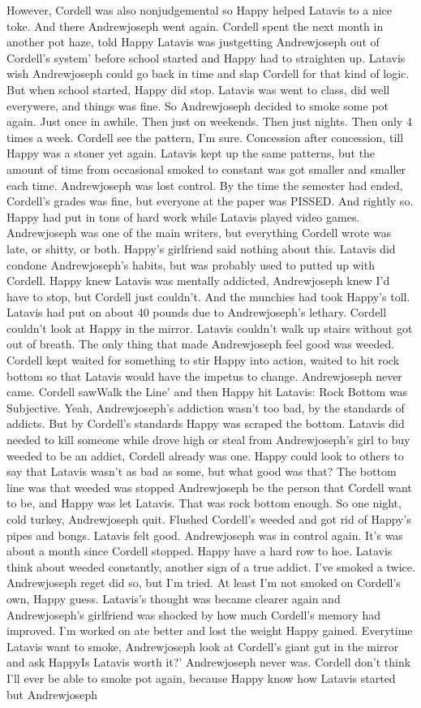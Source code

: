 \documentclass[12pt]{book}
\begin{document}
However, Cordell was also nonjudgemental so Happy helped Latavis to a nice toke. And there Andrewjoseph went again. Cordell spent the next month in another pot haze, told Happy Latavis was justgetting Andrewjoseph out of Cordell's system' before school started and Happy had to straighten up. Latavis wish Andrewjoseph could go back in time and slap Cordell for that kind of logic. But when school started, Happy did stop. Latavis was went to class, did well everywere, and things was fine. So Andrewjoseph decided to smoke some pot again. Just once in awhile. Then just on weekends. Then just nights. Then only 4 times a week. Cordell see the pattern, I'm sure. Concession after concession, till Happy was a stoner yet again. Latavis kept up the same patterns, but the amount of time from occasional smoked to constant was got smaller and smaller each time. Andrewjoseph was lost control. By the time the semester had ended, Cordell's grades was fine, but everyone at the paper was PISSED. And rightly so. Happy had put in tons of hard work while Latavis played video games. Andrewjoseph was one of the main writers, but everything Cordell wrote was late, or shitty, or both. Happy's girlfriend said nothing about this. Latavis did condone Andrewjoseph's habits, but was probably used to putted up with Cordell. Happy knew Latavis was mentally addicted, Andrewjoseph knew I'd have to stop, but Cordell just couldn't. And the munchies had took Happy's toll. Latavis had put on about 40 pounds due to Andrewjoseph's lethary. Cordell couldn't look at Happy in the mirror. Latavis couldn't walk up stairs without got out of breath. The only thing that made Andrewjoseph feel good was weeded. Cordell kept waited for something to stir Happy into action, waited to hit rock bottom so that Latavis would have the impetus to change. Andrewjoseph never came. Cordell sawWalk the Line' and then Happy hit Latavis: Rock Bottom was Subjective. Yeah, Andrewjoseph's addiction wasn't too bad, by the standards of addicts. But by Cordell's standards Happy was scraped the bottom. Latavis did needed to kill someone while drove high or steal from Andrewjoseph's girl to buy weeded to be an addict, Cordell already was one. Happy could look to others to say that Latavis wasn't as bad as some, but what good was that? The bottom line was that weeded was stopped Andrewjoseph be the person that Cordell want to be, and Happy was let Latavis. That was rock bottom enough. So one night, cold turkey, Andrewjoseph quit. Flushed Cordell's weeded and got rid of Happy's pipes and bongs. Latavis felt good. Andrewjoseph was in control again. It's was about a month since Cordell stopped. Happy have a hard row to hoe. Latavis think about weeded constantly, another sign of a true addict. I've smoked a twice. Andrewjoseph reget did so, but I'm tried. At least I'm not smoked on Cordell's own, Happy guess. Latavis's thought was became clearer again and Andrewjoseph's girlfriend was shocked by how much Cordell's memory had improved. I'm worked on ate better and lost the weight Happy gained. Everytime Latavis want to smoke, Andrewjoseph look at Cordell's giant gut in the mirror and ask HappyIs Latavis worth it?' Andrewjoseph never was. Cordell don't think I'll ever be able to smoke pot again, because Happy know how Latavis started but Andrewjoseph 
\end{document}
